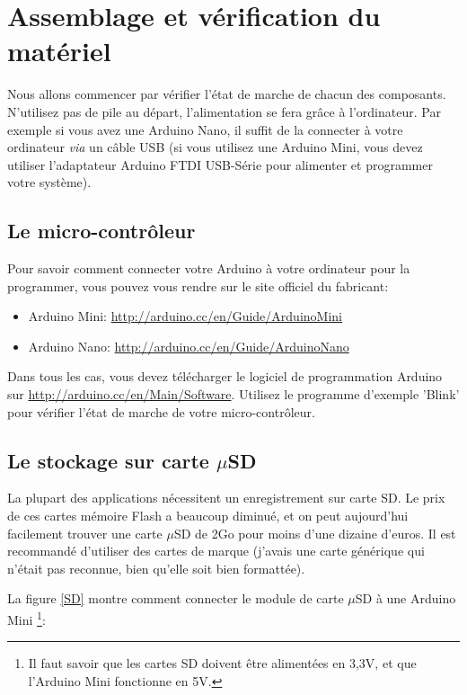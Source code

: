 \documentclass[twocolumn, 8pt]{article}
\begin{document}
\section{Assemblage et vérification du matériel}

\par Nous allons commencer par vérifier l'état de marche de chacun des composants. N'utilisez pas de pile au départ, l'alimentation se fera grâce à l'ordinateur. Par exemple si vous avez une Arduino Nano, il suffit de la connecter à votre ordinateur \textit{via} un câble USB (si vous utilisez une Arduino Mini, vous devez utiliser l'adaptateur Arduino FTDI USB-Série pour alimenter et programmer votre système).


\subsection{Le micro-contrôleur}
\par Pour savoir comment connecter votre Arduino à votre ordinateur pour la programmer, vous pouvez vous rendre sur le site officiel du fabricant: 
\begin{itemize}
	\item Arduino Mini: \url{http://arduino.cc/en/Guide/ArduinoMini}
	\item Arduino Nano: \url{http://arduino.cc/en/Guide/ArduinoNano}
\end{itemize}
\par Dans tous les cas, vous devez télécharger le logiciel de programmation Arduino sur \url{http://arduino.cc/en/Main/Software}. Utilisez le programme d'exemple \textsf{'Blink'} pour vérifier l'état de marche de votre micro-contrôleur.


\subsection{Le stockage sur carte $\mu$SD}
\par La plupart des applications nécessitent un enregistrement sur carte SD. Le prix de ces cartes mémoire Flash a beaucoup diminué, et on peut aujourd'hui facilement trouver une carte $\mu$SD de 2Go pour moins d'une dizaine d'euros. Il est recommandé d'utiliser des cartes de marque (j'avais une carte générique qui n'était pas reconnue, bien qu'elle soit bien formattée).

\par La figure \ref{SD} montre comment connecter le module de carte $\mu$SD à une Arduino Mini \footnote{Il faut savoir que les cartes SD doivent être alimentées en 3,3V, et que l'Arduino Mini fonctionne en 5V.}:
\end{document}
